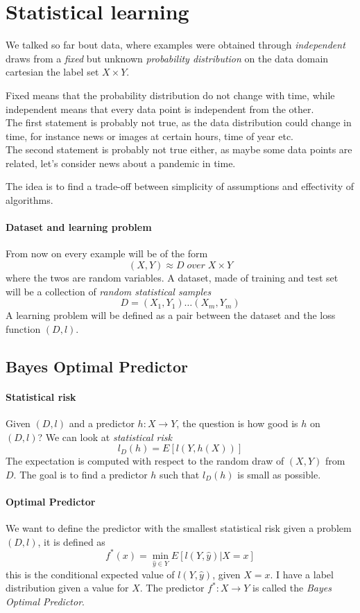 \section{Statistical learning}

We talked so far bout data, where 
examples were obtained through \emph{independent} draws from a \emph{fixed} but unknown 
\emph{probability distribution} on the data domain cartesian the label set $X \times Y$.

Fixed means that the probability distribution do not change with time, while independent means 
that every data point is independent from the other. \\The first statement is probably not true, 
as the data distribution could change in time, for instance news or images at certain hours, 
time of year etc.\\
The second statement is probably not true either, as maybe some data points are related, 
let's consider news about a pandemic in time.

The idea is to find a trade-off between simplicity of assumptions and effectivity of algorithms.

\paragraph{Dataset and learning problem}
From now on every example will be of the form $$(X,Y) \approx D \mathit{\;over\;} X \times Y$$ 
where the twos are random variables.
A dataset, made of training and test set will be a collection of \emph{random statistical samples}
$$D = (X_1, Y_1) \dots (X_m, Y_m)$$
A learning problem will be defined as a pair between the dataset and the loss function $(D,l)$.

\subsection{Bayes Optimal Predictor}

\paragraph{Statistical risk}
Given $(D,l)$ and a predictor $h: X \rightarrow Y$, the question is how good is $h$ on $(D,l)$?
We can look at \emph{statistical risk}
$$l_D(h) = E[l(Y, h(X))]$$
The expectation is computed with respect to the random draw of $(X,Y)$ from $D$.
The goal is to find a predictor $h$ such that $l_D(h)$ is small as possible.

\paragraph{Optimal Predictor}
We want to define the predictor with the smallest statistical risk given a problem $(D,l)$, 
it is defined as
$$f^*(x) = \min_{\hat{y} \in Y}E[l(Y, \hat{y})| X =x]$$
this is the conditional expected value of $l(Y, \hat{y})$, given $X = x$. I have a label 
distribution given a value for $X$.
The predictor $f^* : X \rightarrow Y$ is called the \emph{Bayes Optimal Predictor}.

